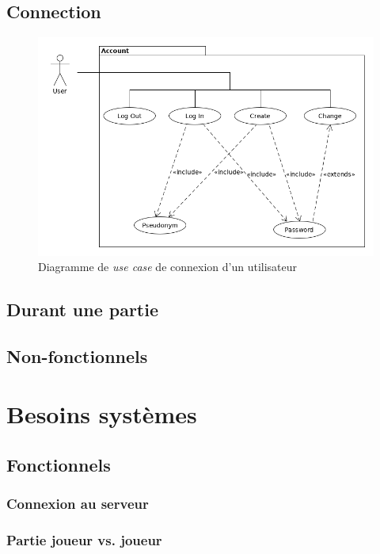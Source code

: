 \documentclass[10pt, a4paper]{article}
\begin{document}
		\subsection{Connection}
\label{connexion}
\begin{figure}[h]
\centering
\includegraphics[scale=0.4]{UC_connexion.png}
\caption{Diagramme de \textit{use case} de connexion d'un utilisateur}
\label{UC_co} %
\end{figure}

		\subsection{Durant une partie}
		
		\subsection{Non-fonctionnels}
		
	\section{Besoins systèmes}
		\subsection{Fonctionnels}
		\subsubsection{Connexion au serveur}
		
		\subsubsection{Partie joueur vs. joueur}
		\label{matchmaker}
		
\end{document}
